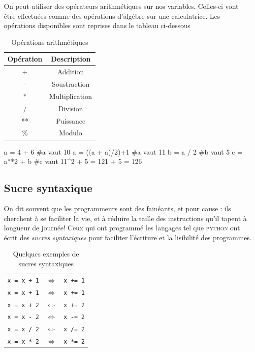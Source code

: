 On peut utiliser des opérateurs arithmétiques sur nos variables. Celles-ci vont être effectuées comme des opérations d'algèbre sur une calculatrice. Les opérations disponibles sont reprises dans le tableau ci-dessous
\begin{table}[!h]
    \centering
    \begin{tabular}{|c|c|}
        \hline
         Opération & Description\\
        \hline
        + & Addition \\
        \hline
        - & Soustraction \\
        \hline
        * & Multiplication \\
        \hline
        / & Division  \\
        \hline
        **  & Puissance \\
        \hline
        \% & Modulo \\
        \hline
    \end{tabular}
    \caption{Opérations arithmétiques}
    \label{oper}
\end{table}
\begin{python}
a = 4 + 6 #a vaut 10
a = ((a + a)/2)+1 #a vaut 11
b = a / 2 #b vaut 5
c = a**2 + b #c vaut 11^2 + 5 = 121 + 5 = 126
\end{python}


\subsection{Sucre syntaxique}

On dit souvent que les programmeurs sont des fainéants, et pour cause : ils cherchent à se faciliter la vie, et à réduire la taille des instructions qu'il tapent à longueur de journée! Ceux qui ont programmé les langages tel que \textsc{python} ont écrit des \textit{sucres syntaxiques} pour faciliter l'écriture et la lisibilité des programmes.

\begin{table}[!h]
    \centering
    \begin{tabular}{ccc}
        \texttt{x = x + 1} & $\Longleftrightarrow$ & \texttt{x += 1} \\
        \texttt{x = x + 1} & $\Longleftrightarrow$ & \texttt{x += 1} \\
        \texttt{x = x + 2} & $\Longleftrightarrow$ & \texttt{x += 2} \\
        \texttt{x = x - 2} &$\Longleftrightarrow$   & \texttt{x -= 2} \\
        \texttt{x = x / 2} &$\Longleftrightarrow$  & \texttt{x /= 2} \\
        \texttt{x = x * 2} &$\Longleftrightarrow$   & \texttt{x *= 2} \\

    \end{tabular}
    \caption{Quelques exemples de sucres syntaxiques}
\end{table}


